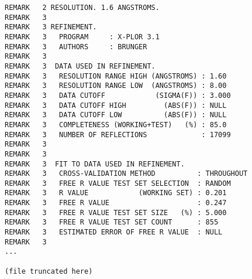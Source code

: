 \begin{lstlisting}
REMARK   2 RESOLUTION. 1.6 ANGSTROMS.                                           
REMARK   3                                                                      
REMARK   3 REFINEMENT.                                                          
REMARK   3   PROGRAM     : X-PLOR 3.1                                           
REMARK   3   AUTHORS     : BRUNGER                                              
REMARK   3                                                                      
REMARK   3  DATA USED IN REFINEMENT.                                            
REMARK   3   RESOLUTION RANGE HIGH (ANGSTROMS) : 1.60                           
REMARK   3   RESOLUTION RANGE LOW  (ANGSTROMS) : 8.00                           
REMARK   3   DATA CUTOFF            (SIGMA(F)) : 3.000                          
REMARK   3   DATA CUTOFF HIGH         (ABS(F)) : NULL                           
REMARK   3   DATA CUTOFF LOW          (ABS(F)) : NULL                           
REMARK   3   COMPLETENESS (WORKING+TEST)   (%) : 85.0                           
REMARK   3   NUMBER OF REFLECTIONS             : 17099                          
REMARK   3                                                                      
REMARK   3                                                                      
REMARK   3  FIT TO DATA USED IN REFINEMENT.                                     
REMARK   3   CROSS-VALIDATION METHOD          : THROUGHOUT                      
REMARK   3   FREE R VALUE TEST SET SELECTION  : RANDOM                          
REMARK   3   R VALUE            (WORKING SET) : 0.201                           
REMARK   3   FREE R VALUE                     : 0.247                           
REMARK   3   FREE R VALUE TEST SET SIZE   (%) : 5.000                           
REMARK   3   FREE R VALUE TEST SET COUNT      : 855                             
REMARK   3   ESTIMATED ERROR OF FREE R VALUE  : NULL                            
REMARK   3                                                                      
... 

(file truncated here)



\end{lstlisting}
